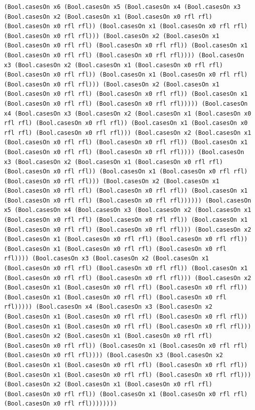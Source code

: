 \documentclass[11pt,letterpaper]{article}
\theoremstyle{spectralthm}
\begin{document}
\begin{lstlisting}[language=Lean4,caption={Standalone Pure Init.Prelude Term-Mode Lean 4 Kernel Suite (thm30--thm61, v0.0.0, 0 sorry, 0 axioms).},label={lst:lean_unified}]
      (Bool.casesOn x6 (Bool.casesOn x5 (Bool.casesOn x4 (Bool.casesOn x3 (Bool.casesOn x2 (Bool.casesOn x1 (Bool.casesOn x0 rfl rfl) (Bool.casesOn x0 rfl rfl)) (Bool.casesOn x1 (Bool.casesOn x0 rfl rfl) (Bool.casesOn x0 rfl rfl))) (Bool.casesOn x2 (Bool.casesOn x1 (Bool.casesOn x0 rfl rfl) (Bool.casesOn x0 rfl rfl)) (Bool.casesOn x1 (Bool.casesOn x0 rfl rfl) (Bool.casesOn x0 rfl rfl)))) (Bool.casesOn x3 (Bool.casesOn x2 (Bool.casesOn x1 (Bool.casesOn x0 rfl rfl) (Bool.casesOn x0 rfl rfl)) (Bool.casesOn x1 (Bool.casesOn x0 rfl rfl) (Bool.casesOn x0 rfl rfl))) (Bool.casesOn x2 (Bool.casesOn x1 (Bool.casesOn x0 rfl rfl) (Bool.casesOn x0 rfl rfl)) (Bool.casesOn x1 (Bool.casesOn x0 rfl rfl) (Bool.casesOn x0 rfl rfl))))) (Bool.casesOn x4 (Bool.casesOn x3 (Bool.casesOn x2 (Bool.casesOn x1 (Bool.casesOn x0 rfl rfl) (Bool.casesOn x0 rfl rfl)) (Bool.casesOn x1 (Bool.casesOn x0 rfl rfl) (Bool.casesOn x0 rfl rfl))) (Bool.casesOn x2 (Bool.casesOn x1 (Bool.casesOn x0 rfl rfl) (Bool.casesOn x0 rfl rfl)) (Bool.casesOn x1 (Bool.casesOn x0 rfl rfl) (Bool.casesOn x0 rfl rfl)))) (Bool.casesOn x3 (Bool.casesOn x2 (Bool.casesOn x1 (Bool.casesOn x0 rfl rfl) (Bool.casesOn x0 rfl rfl)) (Bool.casesOn x1 (Bool.casesOn x0 rfl rfl) (Bool.casesOn x0 rfl rfl))) (Bool.casesOn x2 (Bool.casesOn x1 (Bool.casesOn x0 rfl rfl) (Bool.casesOn x0 rfl rfl)) (Bool.casesOn x1 (Bool.casesOn x0 rfl rfl) (Bool.casesOn x0 rfl rfl)))))) (Bool.casesOn x5 (Bool.casesOn x4 (Bool.casesOn x3 (Bool.casesOn x2 (Bool.casesOn x1 (Bool.casesOn x0 rfl rfl) (Bool.casesOn x0 rfl rfl)) (Bool.casesOn x1 (Bool.casesOn x0 rfl rfl) (Bool.casesOn x0 rfl rfl))) (Bool.casesOn x2 (Bool.casesOn x1 (Bool.casesOn x0 rfl rfl) (Bool.casesOn x0 rfl rfl)) (Bool.casesOn x1 (Bool.casesOn x0 rfl rfl) (Bool.casesOn x0 rfl rfl)))) (Bool.casesOn x3 (Bool.casesOn x2 (Bool.casesOn x1 (Bool.casesOn x0 rfl rfl) (Bool.casesOn x0 rfl rfl)) (Bool.casesOn x1 (Bool.casesOn x0 rfl rfl) (Bool.casesOn x0 rfl rfl))) (Bool.casesOn x2 (Bool.casesOn x1 (Bool.casesOn x0 rfl rfl) (Bool.casesOn x0 rfl rfl)) (Bool.casesOn x1 (Bool.casesOn x0 rfl rfl) (Bool.casesOn x0 rfl rfl))))) (Bool.casesOn x4 (Bool.casesOn x3 (Bool.casesOn x2 (Bool.casesOn x1 (Bool.casesOn x0 rfl rfl) (Bool.casesOn x0 rfl rfl)) (Bool.casesOn x1 (Bool.casesOn x0 rfl rfl) (Bool.casesOn x0 rfl rfl))) (Bool.casesOn x2 (Bool.casesOn x1 (Bool.casesOn x0 rfl rfl) (Bool.casesOn x0 rfl rfl)) (Bool.casesOn x1 (Bool.casesOn x0 rfl rfl) (Bool.casesOn x0 rfl rfl)))) (Bool.casesOn x3 (Bool.casesOn x2 (Bool.casesOn x1 (Bool.casesOn x0 rfl rfl) (Bool.casesOn x0 rfl rfl)) (Bool.casesOn x1 (Bool.casesOn x0 rfl rfl) (Bool.casesOn x0 rfl rfl))) (Bool.casesOn x2 (Bool.casesOn x1 (Bool.casesOn x0 rfl rfl) (Bool.casesOn x0 rfl rfl)) (Bool.casesOn x1 (Bool.casesOn x0 rfl rfl) (Bool.casesOn x0 rfl rfl))))))))


\end{lstlisting}
\end{document}
